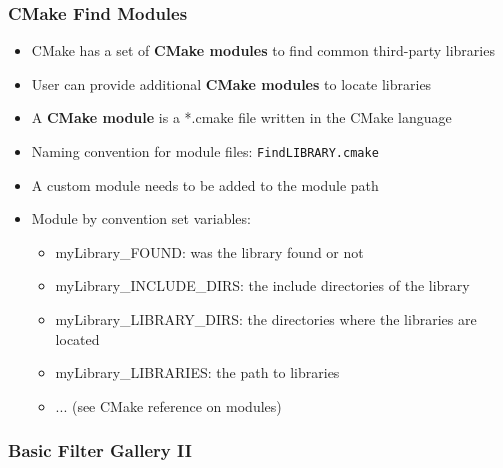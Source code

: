 \begin{frame}
  \frametitle{CMake Find Modules}

    \begin{itemize}
      \item CMake has a set of \textbf{CMake modules} to find common third-party libraries
      \item User can provide additional \textbf{CMake modules} to locate libraries 
      \item A \textbf{CMake module} is a *.cmake file written in the CMake language 
      \item Naming convention for module files: \texttt{FindLIBRARY.cmake} 
      \item A custom module needs to be added to the module path 
      \item Module by convention set variables:
    \begin{itemize}
      \item myLibrary\_FOUND: was the library found or not 
      \item myLibrary\_INCLUDE\_DIRS: the include directories of the library  
      \item myLibrary\_LIBRARY\_DIRS: the directories where the libraries are located  
      \item myLibrary\_LIBRARIES: the path to libraries  
      \item ... (see CMake reference on modules)  
    \end{itemize}
    \end{itemize}

\end{frame}

\begin{frame}

  \frametitle{Basic Filter Gallery II}


\end{frame}

